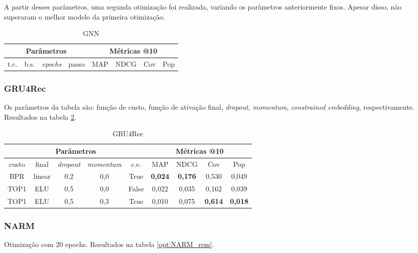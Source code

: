 A partir desses parâmetros, uma segunda otimização foi realizada, variando os
parâmetros anteriormente fixos. Apesar disso, não superaram o melhor modelo da
primeira otimização.

\begin{table}[htbp]
  \centering
  \begin{tabular}{|c|c|c|c|c|c|c|c|}
    \hline
      \multicolumn{4}{|c|}{Parâmetros} & \multicolumn{4}{c|}{Métricas @10} \\
      \hline
      t.c. & b.s. & \textit{epochs} & passo & MAP & NDCG & Cov & Pop \\
      \hline
\end{tabular}
      \caption{GNN}
      \label{opt:GNN_rem_2nd_opt}
\end{table}

\subsubsection{GRU4Rec}

Os parâmetros da tabela são: função de custo, função de ativação final,
\textit{dropout}, \textit{momentum}, \textit{constrained embedding}, respectivamente.
Resultados na tabela \ref{opt:GRU4Rec_rem}.

\begin{table}[htbp]
  \centering
  \begin{tabular}{|c|c|c|c|c|c|c|c|c|}
    \hline
      \multicolumn{5}{|c|}{Parâmetros} & \multicolumn{4}{c|}{Métricas @10} \\
      \hline
      custo & final & \textit{dropout} & \textit{momentum} & c.e. & MAP & NDCG & Cov & Pop \\
      \hline
      BPR & linear & 0,2 & 0,0 & True & \textbf{0,024} & \textbf{0,176} & 0,530 & 0,049 \\
      \hline
      TOP1 & ELU & 0,5 & 0,0 & False & 0,022 & 0,035 & 0,162 & 0,039 \\
      \hline
      TOP1 & ELU & 0,5 & 0,3 & True & 0,010 & 0,075 & \textbf{0,614} & \textbf{0,018} \\
      \hline
\end{tabular}
      \caption{GRU4Rec}
      \label{opt:GRU4Rec_rem}
\end{table}

\subsubsection{NARM}
Otimização com 20 epochs. Resultados na tabela \ref{opt:NARM_rem}.

